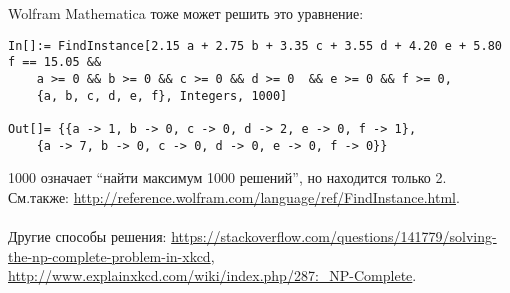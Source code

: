 Wolfram Mathematica тоже может решить это уравнение:

\begin{lstlisting}
In[]:= FindInstance[2.15 a + 2.75 b + 3.35 c + 3.55 d + 4.20 e + 5.80 f == 15.05 && 
	a >= 0 && b >= 0 && c >= 0 && d >= 0  && e >= 0 && f >= 0, 
	{a, b, c, d, e, f}, Integers, 1000]

Out[]= {{a -> 1, b -> 0, c -> 0, d -> 2, e -> 0, f -> 1},
	{a -> 7, b -> 0, c -> 0, d -> 0, e -> 0, f -> 0}}
\end{lstlisting}

1000 означает ``найти максимум 1000 решений'', но находится только 2.
См.также: \url{http://reference.wolfram.com/language/ref/FindInstance.html}.\\
\\
Другие способы решения:
\url{https://stackoverflow.com/questions/141779/solving-the-np-complete-problem-in-xkcd},
\url{http://www.explainxkcd.com/wiki/index.php/287:_NP-Complete}.

